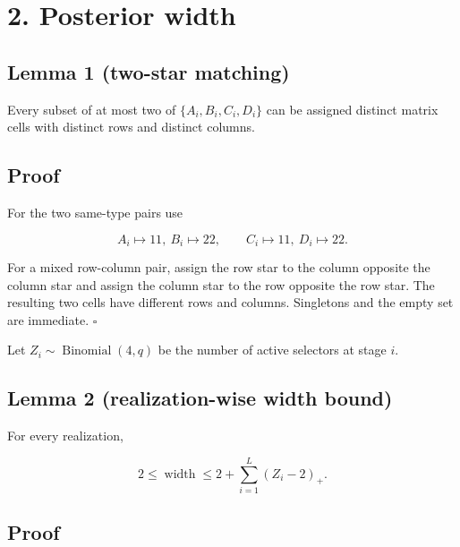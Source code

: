 \documentclass[11pt,a4paper]{article}
\begin{document}
\section*{2. Posterior width}

\subsection*{Lemma 1 (two-star matching)}

Every subset of at most two of \(\{A_i,B_i,C_i,D_i\}\) can be assigned distinct matrix cells with distinct rows and distinct columns.


\subsection*{Proof}

For the two same-type pairs use


\[
 A_i\mapsto11,\ B_i\mapsto22,
 \qquad
 C_i\mapsto11,\ D_i\mapsto22.
\]

For a mixed row-column pair, assign the row star to the column opposite the column star and assign the column star to the row opposite the row star. The resulting two cells have different rows and columns.  Singletons and the empty set are immediate. \(\square\)


Let \(Z_i\sim\operatorname{Binomial}(4,q)\) be the number of active selectors at stage \(i\).


\subsection*{Lemma 2 (realization-wise width bound)}

For every realization,


\begin{equation}
 2\le\operatorname{width}
 \le2+\sum_{i=1}^L(Z_i-2)_+.
\tag{2.1}
\end{equation}

\subsection*{Proof}
\end{document}
